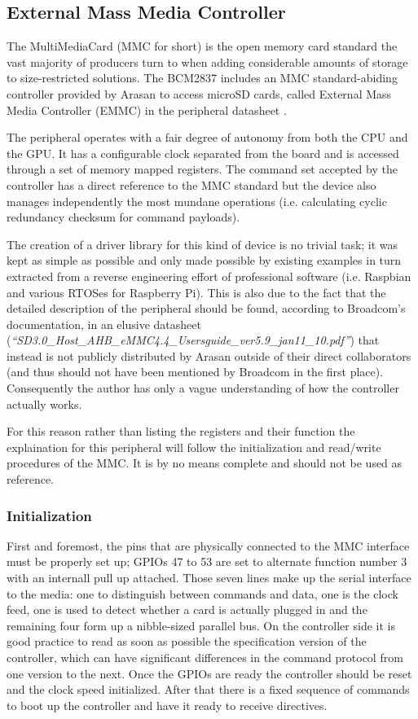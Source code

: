 \documentclass[12pt,a4paper,openright,twoside]{report}
\begin{document}
\subsection{External Mass Media Controller}
\label{emmc}
The MultiMediaCard (MMC for short) is the open memory card standard 
the vast majority of producers turn to when adding considerable amounts of 
storage to size-restricted solutions. The BCM2837 includes an MMC standard-abiding
controller provided by Arasan to access microSD cards, called External Mass Media Controller (EMMC)
in the peripheral datasheet \cite{bcm2835}.

The peripheral operates with a fair degree of autonomy from both the CPU and
the GPU. It has a configurable clock separated from the board and is accessed
through a set of memory mapped registers. The command set accepted by the controller
has a direct reference to the MMC standard but the device also manages independently
the most mundane operations (i.e. calculating cyclic redundancy checksum for
command payloads).

The creation of a driver library for this kind of device is no trivial task; it 
was kept as simple as possible and only made possible by existing examples
 in turn extracted from a reverse engineering effort
of professional software (i.e. Raspbian and various RTOSes for Raspberry Pi).
This is also due to the fact that the detailed description of the peripheral 
should be found, according to Broadcom's documentation, in an elusive datasheet 
(\textit{``SD3.0\_Host\_AHB\_eMMC4.4\_Usersguide\_ver5.9\_jan11\_10.pdf''})
 that instead is 
not publicly distributed by Arasan outside of their direct collaborators
(and thus should not have been mentioned by Broadcom in 
the first place). Consequently the author has only a vague understanding of 
how the controller actually works.

For this reason rather than listing the registers and their function the explaination
for this peripheral will follow the initialization and read/write procedures 
of the MMC. It is by no means complete and should not be used as reference.

\subsubsection{Initialization}
First and foremost, the pins that are physically connected to the MMC interface
must be properly set up; GPIOs 47 to 53 are set to alternate function number 3
with an internall pull up attached. Those seven lines make up the serial interface
to the media: one to distinguish between commands and data, one is the clock feed,
one is used to detect whether a card is actually plugged in and the remaining four
form up a nibble-sized parallel bus.
On the controller side it is good practice to read as soon as possible the specification
version of the controller, which can have significant differences in the command
 protocol from one version to the next.
Once the GPIOs are ready the controller should be reset and the clock speed initialized.
After that there is a fixed sequence of commands to boot up the controller and
have it ready to receive directives.
\end{document}
